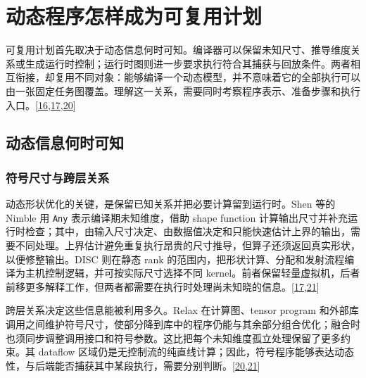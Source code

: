 \documentclass[
  UTF8,
  zihao=5]{ctexart}
\begin{document}
\hypertarget{ux52a8ux6001ux7a0bux5e8fux600eux6837ux6210ux4e3aux53efux590dux7528ux8ba1ux5212}{%
\section{动态程序怎样成为可复用计划}\label{ux52a8ux6001ux7a0bux5e8fux600eux6837ux6210ux4e3aux53efux590dux7528ux8ba1ux5212}}

可复用计划首先取决于动态信息何时可知。编译器可以保留未知尺寸、推导维度关系或生成运行时控制；运行时图则进一步要求执行符合其捕获与回放条件。两者相互衔接，却复用不同对象：能够编译一个动态模型，并不意味着它的全部执行可以由一张固定任务图覆盖。理解这一关系，需要同时考察程序表示、准备步骤和执行入口。{[}\protect\hyperlink{ref-kwon2020nimble}{16},\protect\hyperlink{ref-shen2021nimble}{17},\protect\hyperlink{ref-lai2025relax}{20}{]}

\hypertarget{ux52a8ux6001ux4fe1ux606fux4f55ux65f6ux53efux77e5}{%
\subsection{动态信息何时可知}\label{ux52a8ux6001ux4fe1ux606fux4f55ux65f6ux53efux77e5}}

\hypertarget{ux7b26ux53f7ux5c3aux5bf8ux4e0eux8de8ux5c42ux5173ux7cfb}{%
\subsubsection{符号尺寸与跨层关系}\label{ux7b26ux53f7ux5c3aux5bf8ux4e0eux8de8ux5c42ux5173ux7cfb}}

动态形状优化的关键，是保留已知关系并把必要计算留到运行时。Shen 等的
Nimble 用 \texttt{Any} 表示编译期未知维度，借助 shape function
计算输出尺寸并补充运行时检查；其中，由输入尺寸决定、由数据值决定和只能快速估计上界的输出，需要不同处理。上界估计避免重复执行昂贵的尺寸推导，但算子还须返回真实形状，以便修整输出。DISC
则在静态 rank
的范围内，把形状计算、分配和发射流程编译为主机控制逻辑，并可按实际尺寸选择不同
kernel。前者保留轻量虚拟机，后者前移更多解释工作，但两者都需要在执行时处理尚未知晓的信息。{[}\protect\hyperlink{ref-shen2021nimble}{17},\protect\hyperlink{ref-zhu2021disc}{21}{]}

跨层关系决定这些信息能被利用多久。Relax 在计算图、tensor program
和外部库调用之间维护符号尺寸，使部分降到库中的程序仍能与其余部分组合优化；融合时也须同步调整调用接口和符号参数。这比把每个未知维度孤立处理保留了更多约束。其
dataflow
区域仍是无控制流的纯直线计算；因此，符号程序能够表达动态性，与后端能否捕获其中某段执行，需要分别判断。{[}\protect\hyperlink{ref-lai2025relax}{20},\protect\hyperlink{ref-zhu2021disc}{21}{]}
\end{document}
